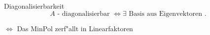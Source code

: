 \documentclass[class=article, crop=false]{standalone}
\begin{document}
\begin{zettel}{Diagonalisierbarkeit}
\[
    A \text{ - diagonalisierbar } \iff \exists \text{ Basis aus Eigenvektoren }
.\]

$ \iff$  Das MinPol zerf"allt in Linearfaktoren

\end{zettel}
\end{document}
